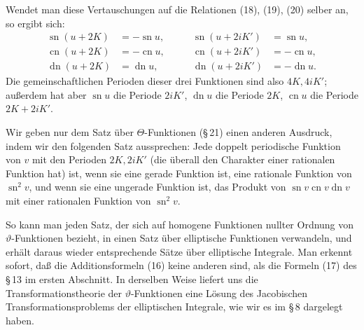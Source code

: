 \documentclass[11pt]{article}
\providecommand{\sn}{\operatorname{sn}}
\providecommand{\cn}{\operatorname{cn}}
\providecommand{\dn}{\operatorname{dn}}
\begin{document}
Wendet man diese Vertauschungen auf die Relationen (18), (19), (20) selber an, so ergibt sich:
\begin{equation}
\begin{aligned}
\sn(u+2K)&=-\sn u,&\qquad \sn(u+2iK')&=\sn u,\\
\cn(u+2K)&=-\cn u,&\qquad \cn(u+2iK')&=-\cn u,\\
\dn(u+2K)&=\dn u,&\qquad \dn(u+2iK')&=-\dn u.
\end{aligned}
\tag{22}
\end{equation}
Die gemeinschaftlichen Perioden dieser drei Funktionen sind also $4K,4iK'$; außerdem hat aber $\sn u$ die Periode $2iK'$, $\dn u$ die Periode $2K$, $\cn u$ die Periode $2K+2iK'$.

Wir geben nur dem Satz über $\Theta$-Funktionen (\S\,21) einen anderen Ausdruck, indem wir den folgenden Satz aussprechen: Jede doppelt periodische Funktion von $v$ mit den Perioden $2K,2iK'$ (die überall den Charakter einer rationalen Funktion hat) ist, wenn sie eine gerade Funktion ist, eine rationale Funktion von $\sn^2v$, und wenn sie eine ungerade Funktion ist, das Produkt von $\sn v\cn v\dn v$ mit einer rationalen Funktion von $\sn^2v$.

So kann man jeden Satz, der sich auf homogene Funktionen nullter Ordnung von $\vartheta$-Funktionen bezieht, in einen Satz über elliptische Funktionen verwandeln, und erhält daraus wieder entsprechende Sätze über elliptische Integrale. Man erkennt sofort, daß die Additionsformeln (16) keine anderen sind, als die Formeln (17) des \S\,13 im ersten Abschnitt. In derselben Weise liefert uns die Transformationstheorie der $\vartheta$-Funktionen eine Lösung des Jacobischen Transformationsproblems der elliptischen Integrale, wie wir es im \S\,8 dargelegt haben.
\end{document}
